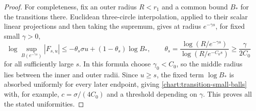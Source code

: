 \begin{proof}
For completeness, fix an outer radius $R<r_1$ and a common
bound $B_*$ for the transitions there.  Euclidean
three-circle interpolation, applied to their scalar linear
projections and then taking the supremum, gives at radius
$e^{-\gamma s}$, for fixed small $\gamma>0$,
\[
 \log\sup_{B(e^{-\gamma s})}|F_{s,u}|
 \le-\theta_s\sigma u+(1-\theta_s)\log B_*,
 \qquad
 \theta_s=\frac{\log(R/e^{-\gamma s})}
                 {\log(R/e^{-C_0s})}
 \ge\frac{\gamma}{2C_0}
\]
for all sufficiently large $s$.  In this formula choose
$\gamma_0<C_0$, so the middle radius lies between the
inner and outer radii.  Since $u\ge s$, the fixed term
$\log B_*$ is absorbed uniformly for every later endpoint,
giving \eqref{chart:transition-small-balls} with, for
example, $c=\sigma/(4C_0)$ and a threshold depending on
$\gamma$.  This proves all the stated uniformities.
\end{proof}
